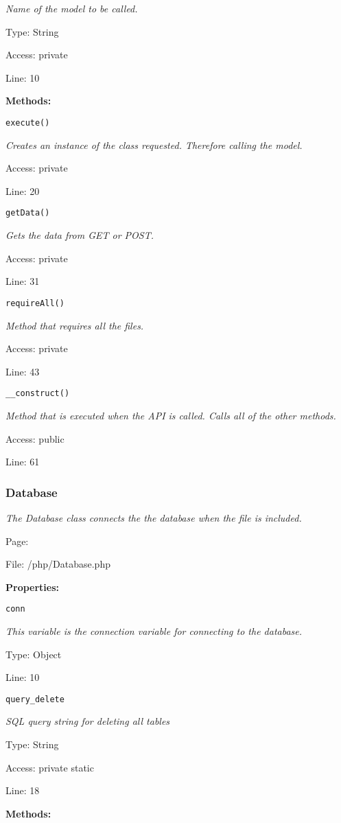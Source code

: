 {\scriptsize
\textit{Name of the model to be called.}

Type: String

Access: private

Line: 10

}
\textbf{Methods:}

\texttt{execute()}

{\scriptsize
\textit{Creates an instance of the class requested.
Therefore calling the model.}

Access: private

Line: 20

}

\texttt{getData()}

{\scriptsize
\textit{Gets the data from GET or POST.}

Access: private

Line: 31

}

\texttt{requireAll()}

{\scriptsize
\textit{Method that requires all the files.}

Access: private

Line: 43

}

\texttt{\_\_construct()}

{\scriptsize
\textit{Method that is executed when the API is called.
Calls all of the other methods.}

Access: public

Line: 61

}

\subsubsection{Database}\label{Database.php.doc}
\textit{The Database class connects the the database when the file is included.}

Page: \pageref{Database.php}

File: /php/Database.php

\textbf{Properties:}

\texttt{conn}

{\scriptsize
\textit{This variable is the connection variable for connecting to the database.}

Type: Object

Line: 10

}
\texttt{query\_delete}

{\scriptsize
\textit{SQL query string for deleting all tables}

Type: String

Access: private static

Line: 18

}
\textbf{Methods:}

